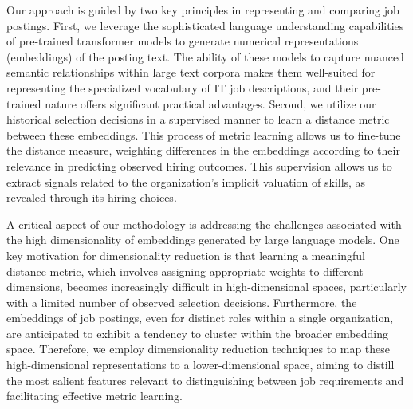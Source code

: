 Our approach is guided by two key principles in representing and comparing job postings. First, we leverage 
the sophisticated language understanding capabilities of pre-trained transformer models to generate numerical 
representations (embeddings) of the posting text. The ability of these models to capture nuanced semantic 
relationships within large text corpora makes them well-suited for representing the specialized vocabulary 
of IT job descriptions, and their pre-trained nature offers significant practical advantages. Second, we 
utilize our historical selection decisions in a supervised manner to learn a distance metric between these embeddings. 
This process of metric learning allows us to fine-tune the distance measure, weighting differences in the 
embeddings according to their relevance in predicting observed hiring outcomes. This supervision allows us to 
extract signals related to the organization's implicit valuation of skills, as revealed through its hiring choices.


A critical aspect of our methodology is addressing the challenges associated with the high dimensionality of embeddings 
generated by large language models. One key motivation for dimensionality reduction is that learning a meaningful distance 
metric, which involves assigning appropriate weights to different dimensions, becomes increasingly difficult in 
high-dimensional spaces, particularly with a limited number of observed selection decisions. Furthermore, the 
embeddings of job postings, even for distinct roles within a single organization, are anticipated to exhibit a 
tendency to cluster within the broader embedding space. Therefore, we employ dimensionality reduction techniques 
to map these high-dimensional representations to a lower-dimensional space, aiming to distill the most salient 
features relevant to distinguishing between job requirements and facilitating effective metric learning.

